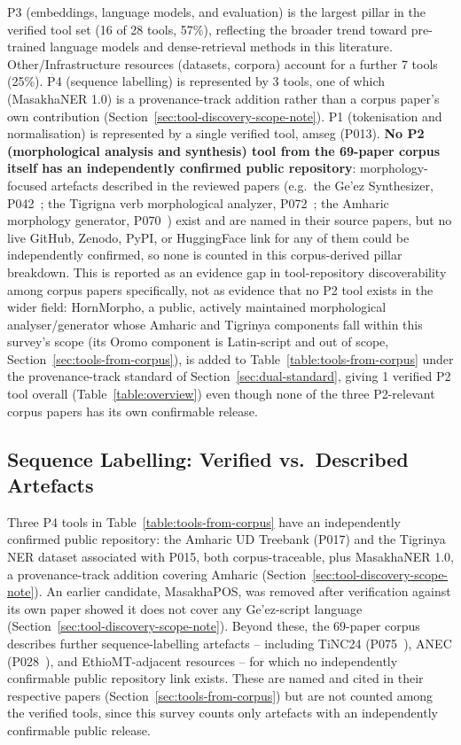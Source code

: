 \documentclass[sn-mathphys-num]{sn-jnl}
\theoremstyle{thmstyleone}
\theoremstyle{thmstyletwo}
\theoremstyle{thmstylethree}
\begin{document}
P3 (embeddings, language models, and evaluation) is the largest pillar in the verified tool set (16 of 28 tools, 57\%), reflecting the broader trend toward pre-trained language models and dense-retrieval methods in this literature. Other/Infrastructure resources (datasets, corpora) account for a further 7 tools (25\%). P4 (sequence labelling) is represented by 3 tools, one of which (MasakhaNER 1.0) is a provenance-track addition rather than a corpus paper's own contribution (Section~\ref{sec:tool-discovery-scope-note}). P1 (tokenisation and normalisation) is represented by a single verified tool, amseg (P013). \textbf{No P2 (morphological analysis and synthesis) tool from the 69-paper corpus itself has an independently confirmed public repository}: morphology-focused artefacts described in the reviewed papers (e.g.\ the Ge'ez Synthesizer, P042~\citep{gidey_morphological_2024}; the Tigrigna verb morphological analyzer, P072~\citep{gebremeskel_tigrigna_2023}; the Amharic morphology generator, P070~\citep{nigusie_suffixinflectional_2024}) exist and are named in their source papers, but no live GitHub, Zenodo, PyPI, or HuggingFace link for any of them could be independently confirmed, so none is counted in this corpus-derived pillar breakdown. This is reported as an evidence gap in tool-repository discoverability among corpus papers specifically, not as evidence that no P2 tool exists in the wider field: HornMorpho, a public, actively maintained morphological analyser/generator whose Amharic and Tigrinya components fall within this survey's scope (its Oromo component is Latin-script and out of scope, Section~\ref{sec:tools-from-corpus}), is added to Table~\ref{table:tools-from-corpus} under the provenance-track standard of Section~\ref{sec:dual-standard}, giving 1 verified P2 tool overall (Table~\ref{table:overview}) even though none of the three P2-relevant corpus papers has its own confirmable release.

\subsection{Sequence Labelling: Verified vs.\ Described Artefacts}\label{sec:p4}

Three P4 tools in Table~\ref{table:tools-from-corpus} have an independently confirmed public repository: the Amharic UD Treebank (P017) and the Tigrinya NER dataset associated with P015, both corpus-traceable, plus MasakhaNER 1.0, a provenance-track addition covering Amharic (Section~\ref{sec:tool-discovery-scope-note}). An earlier candidate, MasakhaPOS, was removed after verification against its own paper showed it does not cover any Ge'ez-script language (Section~\ref{sec:tool-discovery-scope-note}). Beyond these, the 69-paper corpus describes further sequence-labelling artefacts -- including TiNC24 (P075~\citep{berhane_towards_2025}), ANEC (P028~\citep{jibril_anec_2022}), and EthioMT-adjacent resources -- for which no independently confirmable public repository link exists. These are named and cited in their respective papers (Section~\ref{sec:tools-from-corpus}) but are not counted among the verified tools, since this survey counts only artefacts with an independently confirmable public release.
\end{document}
